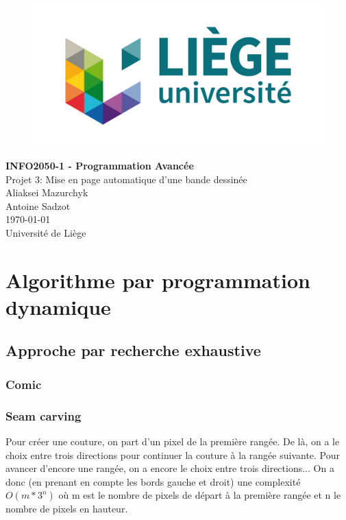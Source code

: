 \documentclass[10pt]{article}
\begin{document}
\begin{titlepage}

   \begin{figure}[htbp]
      \centering
      \includegraphics{uliege-logo-couleurs-300.jpg}
   \end{figure}
  	
  	\hfill

	\begin{center}
		\vfill
		\textbf{
		\Huge{INFO2050-1 - Programmation Avancée}}\\
		\bigskip
		\huge{Projet 3: Mise en page automatique d'une bande dessinée}\\
		\bigskip %
		\smallskip
		\Large{Aliaksei Mazurchyk\\Antoine Sadzot}\\
		\bigskip
		\smallskip
		\large{\today}\\%
		\vfill
		\large{Université de Liège}
	\end{center}
\end{titlepage}
\clearpage
\clearpage

\section{Algorithme par programmation dynamique}
\subsection{Approche par recherche exhaustive}
\subsubsection{Comic}
\subsubsection{Seam carving}
Pour créer une couture, on part d'un pixel de la première rangée. De là, on a le choix entre trois directions pour continuer la couture à la rangée suivante. Pour avancer d'encore une rangée, on a encore le choix entre trois directions... On a donc (en prenant en compte les bords gauche et droit) une complexité $O(m*3^n)$ où m est le nombre de pixels de départ à la première rangée et n le nombre de pixels en hauteur.
\end{document}
